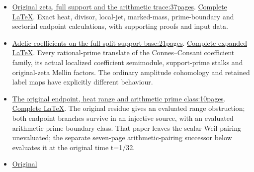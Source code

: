 \documentclass[
]{article}
\begin{document}
\begin{itemize}
\item
  \href{https://github.com/KokunoYumeto/zeta-function-research-reader/blob/main/workbenches/splitzero-tandem/continuations/20260923-retained-source-readers/original-zeta-full-support/ORIGINAL_ZETA_RECONSTRUCTION.pdf}{Original
  zeta, full support and the arithmetic trace:37pages}.
  \href{https://github.com/KokunoYumeto/zeta-function-research-reader/blob/main/workbenches/splitzero-tandem/continuations/20260923-retained-source-readers/original-zeta-full-support/ORIGINAL_ZETA_RECONSTRUCTION.tex}{Complete
  LaTeX}. Exact heat, divisor, local-jet, marked-mass, prime-boundary
  and sectorial endpoint calculations, with supporting proofs and input
  data.
\item
  \href{https://github.com/KokunoYumeto/zeta-function-research-reader/blob/main/workbenches/splitzero-tandem/continuations/20260923-retained-source-readers/localized-adelic-coefficients/CC_LOCALIZED_SUPPORT_READER.pdf}{Adelic
  coefficients on the full split-support base:21pages}.
  \href{https://github.com/KokunoYumeto/zeta-function-research-reader/blob/main/workbenches/splitzero-tandem/continuations/20260923-retained-source-readers/localized-adelic-coefficients/CC_LOCALIZED_SUPPORT_READER.tex}{Complete
  expanded LaTeX}. Every rational-prime translate of the Connes--Consani
  coefficient family, its actual localized coefficient semimodule,
  support-prime stalks and original-zeta Mellin factors. The ordinary
  amplitude cohomology and retained label maps have explicitly different
  behaviour.
\item
  \href{https://github.com/KokunoYumeto/zeta-function-research-reader/blob/main/workbenches/splitzero-tandem/continuations/20260923-retained-source-readers/endpoint-resonance/NOTE.pdf}{The
  original endpoint, heat range and arithmetic prime class:10pages}.
  \href{https://github.com/KokunoYumeto/zeta-function-research-reader/blob/main/workbenches/splitzero-tandem/continuations/20260923-retained-source-readers/endpoint-resonance/ENDPOINT_RESONANCE_AND_PRIME_CLASS.tex}{Complete
  LaTeX}. The original residue gives an evaluated range obstruction;
  both endpoint branches survive in an injective source, with an
  evaluated arithmetic prime-boundary class. That paper leaves the
  scalar Weil pairing unevaluated; the separate seven-page
  arithmetic-pairing successor below evaluates it at the original time
  t=1/32.
\item
  \href{https://github.com/KokunoYumeto/zeta-function-research-reader/blob/main/workbenches/splitzero-tandem/continuations/20260923-retained-source-readers/original-zeta-coefficient-return/ORIGINAL_ZETA_RECONSTRUCTION.tex}{Original
}
\end{itemize}
\end{document}
